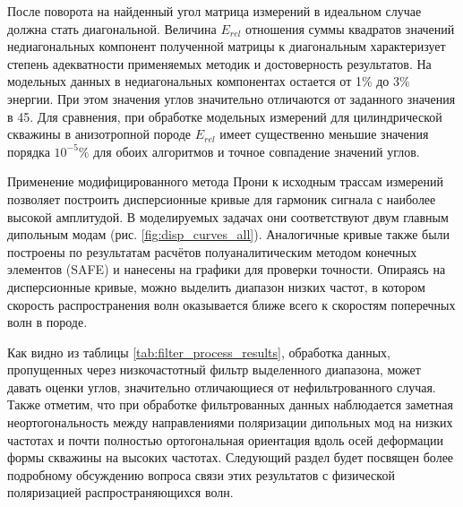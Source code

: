 \documentclass[a4paper,11pt]{article}
\begin{document}
После поворота на найденный угол матрица измерений в идеальном случае должна стать диагональной. Величина $E_{rel}$ отношения суммы квадратов значений недиагональных компонент полученной матрицы к диагональным характеризует степень адекватности применяемых методик и достоверность результатов. На модельных данных в недиагональных компонентах остается от 1\% до 3\% энергии. При этом значения углов значительно отличаются от заданного значения в 45\textdegree. Для сравнения, при обработке модельных измерений для цилиндрической скважины в анизотропной породе $E_{rel}$ имеет существенно меньшие значения порядка $10^{-5}\%$ для обоих алгоритмов и точное совпадение значений углов. 

Применение модифицированного метода Прони \cite{Ekstrom1995} к исходным трассам измерений позволяет построить дисперсионные кривые для гармоник сигнала с наиболее высокой амплитудой. В моделируемых задачах они соответствуют двум главным дипольным модам (рис. \ref{fig:disp_curves_all}). Аналогичные кривые также были построены по результатам расчётов полуаналитическим методом конечных элементов (SAFE) и нанесены на графики для проверки точности. Опираясь на дисперсионные кривые, можно выделить диапазон низких частот, в котором скорость распространения волн оказывается ближе всего к скоростям поперечных волн в породе. 

Как видно из таблицы \ref{tab:filter_process_results}, обработка данных, пропущенных через низкочастотный фильтр выделенного диапазона, может давать оценки углов, значительно отличающиеся от нефильтрованного случая. Также отметим, что при обработке фильтрованных данных наблюдается заметная неортогональность между направлениями поляризации дипольных мод на низких частотах и почти полностью ортогональная ориентация вдоль осей деформации формы скважины на высоких частотах. Следующий раздел будет посвящен более подробному обсуждению вопроса связи этих результатов с физической поляризацией распространяющихся волн.
\end{document}
